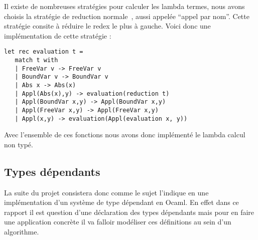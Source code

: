 \documentclass{article}
\theoremstyle{definition}
\theoremstyle{remark}
\begin{document}
Il existe de nombreuses stratégies pour calculer les lambda termes,
nous avons choisis la stratégie de reduction
normale~\citep{pierce:tapl}, aussi appelée ``appel par nom''.  Cette
stratégie consite à réduire le redex le plus à gauche. Voici donc une
implémentation de cette stratégie :

\begin{verbatim}
let rec evaluation t =
   match t with  
   | FreeVar v -> FreeVar v  
   | BoundVar v -> BoundVar v  
   | Abs x -> Abs(x) 
   | Appl(Abs(x),y) -> evaluation(reduction t) 
   | Appl(BoundVar x,y) -> Appl(BoundVar x,y)  
   | Appl(FreeVar x,y) -> Appl(FreeVar x,y)  
   | Appl(x,y) -> evaluation(Appl(evaluation x, y))
\end{verbatim}

Avec l'ensemble de ces fonctions nous avons donc implémenté le lambda
calcul non typé.


\subsection{Types dépendants}


La suite du projet consistera donc comme le sujet l'indique en une
implémentation d'un système de type dépendant en Ocaml. En effet dans 
ce rapport il est question d'une déclaration des types dépendants
mais pour en faire une application concrète il va falloir modéliser ces 
définitions au sein d'un algorithme. \citep{loeh:tuto-dependant,coquand:mini-tt}



\clearpage


  
\end{document}
